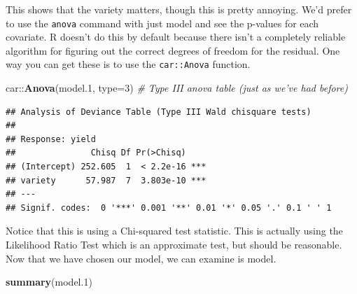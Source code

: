 \documentclass[]{book}
\newenvironment{Shaded}{\begin{snugshade}}{\end{snugshade}}
\newcommand{\KeywordTok}[1]{\textcolor[rgb]{0.13,0.29,0.53}{\textbf{{#1}}}}
\newcommand{\DataTypeTok}[1]{\textcolor[rgb]{0.13,0.29,0.53}{{#1}}}
\newcommand{\DecValTok}[1]{\textcolor[rgb]{0.00,0.00,0.81}{{#1}}}
\newcommand{\FloatTok}[1]{\textcolor[rgb]{0.00,0.00,0.81}{{#1}}}
\newcommand{\CommentTok}[1]{\textcolor[rgb]{0.56,0.35,0.01}{\textit{{#1}}}}
\newcommand{\NormalTok}[1]{{#1}}
\theoremstyle{definition}
\theoremstyle{definition}
\theoremstyle{remark}
\begin{document}
This shows that the variety matters, though this is pretty annoying.
We'd prefer to use the \texttt{anova} command with just model and see
the p-values for each covariate. R doesn't do this by default because
there isn't a completely reliable algorithm for figuring out the correct
degrees of freedom for the residual. One way you can get these is to use
the \texttt{car::Anova} function.

\begin{Shaded}
\begin{Highlighting}[]
\NormalTok{car::}\KeywordTok{Anova}\NormalTok{(model}\FloatTok{.1}\NormalTok{, }\DataTypeTok{type=}\DecValTok{3}\NormalTok{)  }\CommentTok{# Type III anova table (just as we've had before)}
\end{Highlighting}
\end{Shaded}

\begin{verbatim}
## Analysis of Deviance Table (Type III Wald chisquare tests)
## 
## Response: yield
##               Chisq Df Pr(>Chisq)    
## (Intercept) 252.605  1  < 2.2e-16 ***
## variety      57.987  7  3.803e-10 ***
## ---
## Signif. codes:  0 '***' 0.001 '**' 0.01 '*' 0.05 '.' 0.1 ' ' 1
\end{verbatim}

Notice that this is using a Chi-squared test statistic. This is actually
using the Likelihood Ratio Test which is an approximate test, but should
be reasonable. Now that we have chosen our model, we can examine is
model.

\begin{Shaded}
\begin{Highlighting}[]
\KeywordTok{summary}\NormalTok{(model}\FloatTok{.1}\NormalTok{)}
\end{Highlighting}
\end{Shaded}
\end{document}
